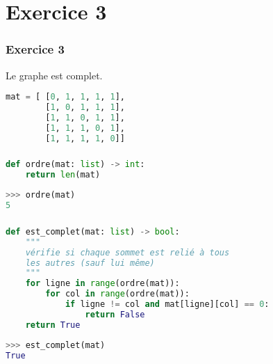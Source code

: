\documentclass[svgnames,11pt]{beamer}
\begin{document}
\section{Exercice 3}
\begin{frame}[fragile]
    \frametitle{Exercice 3}
Le graphe est complet.
    
\begin{center}
\begin{lstlisting}[language=Python , basicstyle=\ttfamily\small, xleftmargin=2em, xrightmargin=2em]
mat = [ [0, 1, 1, 1, 1],
        [1, 0, 1, 1, 1],
        [1, 1, 0, 1, 1],
        [1, 1, 1, 0, 1],
        [1, 1, 1, 1, 0]]
\end{lstlisting}
\label{CODE}
\end{center}
\end{frame}
\begin{frame}[fragile]
    \frametitle{}

\begin{center}
\begin{lstlisting}[language=Python , basicstyle=\ttfamily\small, xleftmargin=2em, xrightmargin=2em]
def ordre(mat: list) -> int:
    return len(mat)
\end{lstlisting}
\end{center}    
\begin{center}
\begin{lstlisting}[language=Python , basicstyle=\ttfamily\small, xleftmargin=2em, xrightmargin=2em]
>>> ordre(mat)
5
\end{lstlisting}
\label{CODE}
\end{center}
\end{frame}
\begin{frame}[fragile]
    \frametitle{}

\begin{center}
\begin{lstlisting}[language=Python , basicstyle=\ttfamily\small, xleftmargin=2em, xrightmargin=2em]
def est_complet(mat: list) -> bool:
    """
    vérifie si chaque sommet est relié à tous
    les autres (sauf lui même)
    """
    for ligne in range(ordre(mat)):
        for col in range(ordre(mat)):
            if ligne != col and mat[ligne][col] == 0:
                return False
    return True
\end{lstlisting}
\end{center}  
\begin{center}
\begin{lstlisting}[language=Python , basicstyle=\ttfamily\small, xleftmargin=2em, xrightmargin=2em]
>>> est_complet(mat)
True
\end{lstlisting}
\label{CODE}
\end{center}
\end{frame}
\end{document}
